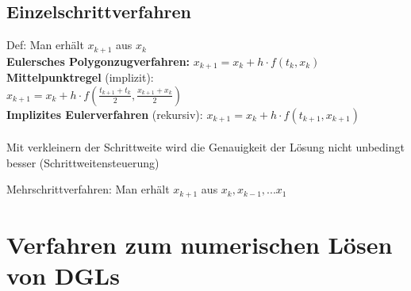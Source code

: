 \documentclass[fs, footer]{latex4ei}
\begin{document}
\begin{sectionbox}
\begin{sectionbox}
\begin{sectionbox}
	\subsection{Einzelschrittverfahren}
	Def: Man erhält $x_{k+1}$ aus $x_k$\\
	\textbf{Eulersches Polygonzugverfahren:} $x_{k+1} = x_k + h \cdot f(t_k,x_k)$\\
	\textbf{Mittelpunktregel} (implizit): \\ $x_{k+1} = x_k + h \cdot f(\frac{t_{k+1}+t_k}{2},\frac{x_{k+1}+x_k}{2})$\\
	\textbf{Implizites Eulerverfahren} (rekursiv): $x_{k+1} = x_k + h \cdot f(t_{k+1},x_{k+1})$\\
	\\
	Mit verkleinern der Schrittweite wird die Genauigkeit der Lösung nicht unbedingt besser (Schrittweitensteuerung)
	
	Mehrschrittverfahren: Man erhält $x_{k+1}$ aus $x_k, x_{k-1}, ... x_1$
\end{sectionbox}

\section{Verfahren zum numerischen Lösen von DGLs}

\begin{sectionbox}

\end{sectionbox}
\end{sectionbox}
\end{sectionbox}
\end{document}
